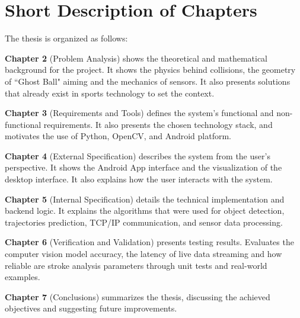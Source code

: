 \section{Short Description of Chapters}

The thesis is organized as follows:

\textbf{Chapter 2} (Problem Analysis) shows the theoretical and mathematical background for the project. It shows the physics behind collisions, the geometry of ``Ghost Ball" aiming and the mechanics of sensors. It also presents solutions that already exist in sports technology to set the context.  

\textbf{Chapter 3} (Requirements and Tools) defines the system's functional and non-functional requirements. It also presents the chosen technology stack, and motivates the use of Python, OpenCV, and Android platform.

\textbf{Chapter 4} (External Specification) describes the system from the user's perspective. It shows the Android App interface and the visualization of the desktop interface. It also explains how the user interacts with the system. 

\textbf{Chapter 5} (Internal Specification) details the technical implementation and backend logic. It explains the algorithms that were used for object detection, trajectories prediction, TCP/IP communication, and sensor data processing.

\textbf{Chapter 6} (Verification and Validation) presents testing results. Evaluates the computer vision model accuracy, the latency of live data streaming and how reliable are stroke analysis parameters through unit tests and real-world examples.

\textbf{Chapter 7} (Conclusions) summarizes the thesis, discussing the achieved objectives and suggesting future improvements. 